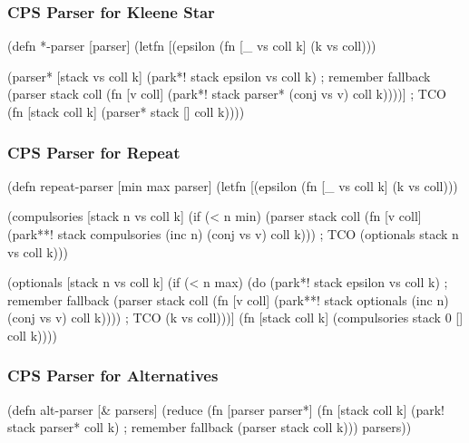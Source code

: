 \documentclass{beamer}
\begin{document}

\begin{frame}[fragile]
\frametitle{CPS Parser for Kleene Star}

{\scriptsize
\begin{semiverbatim}
(defn *-parser [parser]
  (letfn [(epsilon (fn [_ vs coll k] (k vs coll)))

          (parser* [stack vs coll k]
            (park*! stack epsilon vs coll k) ; remember fallback
            (parser stack coll
                    (fn [v coll]
                      (park*! stack parser* (conj vs v) coll k))))] ; TCO
    (fn [stack coll k] (parser* stack [] coll k))))
\end{semiverbatim}
}

\end{frame}


\begin{frame}[fragile]
\frametitle{CPS Parser for Repeat}

{\scriptsize
\begin{semiverbatim}
(defn repeat-parser [min max parser]
  (letfn [(epsilon (fn [_ vs coll k] (k vs coll)))

          (compulsories [stack n vs coll k]
            (if (< n min)
              (parser stack coll
                      (fn [v coll]
                        (park**! stack compulsories
                                 (inc n) (conj vs v) coll k))) ; TCO
              (optionals stack n vs coll k)))

          (optionals [stack n vs coll k]
            (if (< n max)
              (do
                (park*! stack epsilon vs coll k) ; remember fallback
                (parser stack coll
                        (fn [v coll]
                          (park**! stack optionals
                                   (inc n) (conj vs v) coll k)))) ; TCO
              (k vs coll)))]
    (fn [stack coll k] (compulsories stack 0 [] coll k))))
\end{semiverbatim}
}

\end{frame}


\begin{frame}[fragile]
\frametitle{CPS Parser for Alternatives}

{\scriptsize
\begin{semiverbatim}
(defn alt-parser [& parsers]
  (reduce (fn [parser parser*]
            (fn [stack coll k]
              (park! stack parser* coll k) ; remember fallback
              (parser stack coll k)))
          parsers))
\end{semiverbatim}
}

\end{frame}
\end{document}
